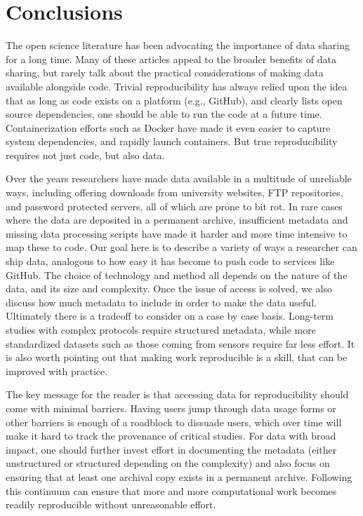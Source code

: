 \documentclass[
]{article}
\begin{document}
\hypertarget{conclusions}{%
\section{Conclusions}\label{conclusions}}

The open science literature has been advocating the importance of data sharing for a long time. Many of these articles appeal to the broader benefits of data sharing, but rarely talk about the practical considerations of making data available alongside code. Trivial reproducibility has always relied upon the idea that as long as code exists on a platform (e.g., GitHub), and clearly lists open source dependencies, one should be able to run the code at a future time. Containerization efforts such as Docker have made it even easier to capture system dependencies, and rapidly launch containers. But true reproducibility requires not just code, but also data.

Over the years researchers have made data available in a multitude of unreliable ways, including offering downloads from university websites, FTP repositories, and password protected servers, all of which are prone to bit rot. In rare cases where the data are deposited in a permanent archive, insufficient metadata and missing data processing scripts have made it harder and more time intensive to map these to code. Our goal here is to describe a variety of ways a researcher can ship data, analogous to how easy it has become to push code to services like GitHub. The choice of technology and method all depends on the nature of the data, and its size and complexity. Once the issue of access is solved, we also discuss how much metadata to include in order to make the data useful. Ultimately there is a tradeoff to consider on a case by case basis. Long-term studies with complex protocols require structured metadata, while more standardized datasets such as those coming from sensors require far less effort. It is also worth pointing out that making work reproducible is a skill, that can be improved with practice.

The key message for the reader is that accessing data for reproducibility should come with minimal barriers. Having users jump through data usage forms or other barriers is enough of a roadblock to dissuade users, which over time will make it hard to track the provenance of critical studies. For data with broad impact, one should further invest effort in documenting the metadata (either unstructured or structured depending on the complexity) and also focus on ensuring that at least one archival copy exists in a permanent archive. Following this continuum can ensure that more and more computational work becomes readily reproducible without unreasonable effort.
\end{document}

